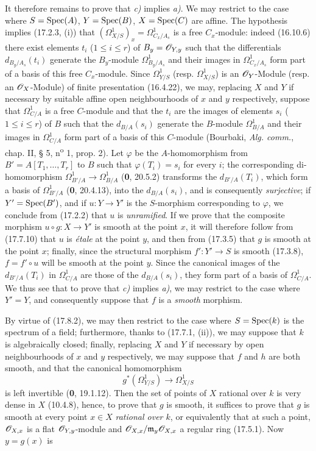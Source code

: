 
It therefore remains to prove that \emph{c)} implies \emph{a)}. We may restrict to the case where $S=\operatorname{Spec}(A)$, $Y=\operatorname{Spec}(B)$, $X=\operatorname{Spec}(C)$ are affine. The hypothesis implies (17.2.3, (i)) that $(\varOmega^1_{X/S})_x=\Omega^1_{C_x/A_s}$ is a free $C_x$-module: indeed (16.10.6) there exist elements $t_i$ ($1\leq i\leq r$) of $B_y=\mathscr{O}_{Y,y}$ such that the differentials $d_{B_y/A_s}(t_i)$ generate the $B_y$-module $\Omega^1_{B_y/A_s}$ and their images in $\Omega^1_{C_x/A_s}$ form part of a basis of this free $C_x$-module. Since $\varOmega^1_{Y/S}$ (resp. $\varOmega^1_{X/S}$) is an $\mathscr{O}_Y$-Module (resp. an $\mathscr{O}_X$-Module) of finite presentation (16.4.22), we may, replacing $X$ and $Y$ if necessary by suitable affine open neighbourhoods of $x$ and $y$ respectively, suppose that $\Omega^1_{C/A}$ is a free $C$-module and that the $t_i$ are the images of elements $s_i$ ($1\leq i\leq r$) of $B$ such that the $d_{B/A}(s_i)$ generate the $B$-module $\Omega^1_{B/A}$ and their images in $\Omega^1_{C/A}$ form part of a basis of this $C$-module (Bourbaki, \emph{Alg. comm.}, chap. II, § 5, n\textsuperscript{o} 1, prop. 2). Let $\varphi$ be the $A$-homomorphism from $B'=A[T_1,\ldots,T_r]$ to $B$ such that $\varphi(T_i)=s_i$ for every $i$; the corresponding di-homomorphism $\Omega^1_{B'/A}\to\Omega^1_{B/A}$ (\textbf{0}, 20.5.2) transforms the $d_{B'/A}(T_i)$, which form a basis of $\Omega^1_{B'/A}$ (\textbf{0}, 20.4.13), into the $d_{B/A}(s_i)$, and is consequently \emph{surjective}; if $Y'=\operatorname{Spec}(B')$, and if $u:Y\to Y'$ is the $S$-morphism corresponding to $\varphi$, we conclude from (17.2.2) that $u$ is \emph{unramified}. If we prove that the composite morphism $u\circ g:X\to Y'$ is smooth at the point $x$, it will therefore follow from (17.7.10) that $u$ is \emph{étale} at the point $y$, and then from (17.3.5) that $g$ is smooth at the point $x$; finally, since the structural morphism $f':Y'\to S$ is smooth (17.3.8), $f=f'\circ u$ will be smooth at the point $y$. Since the canonical images of the $d_{B'/A}(T_i)$ in $\Omega^1_{C/A}$ are those of the $d_{B/A}(s_i)$, they form part of a basis of $\Omega^1_{C/A}$. We thus see that to prove that \emph{c)} implies \emph{a)}, we may restrict to the case where $Y'=Y$, and consequently suppose that $f$ is a \emph{smooth} morphism.

By virtue of (17.8.2), we may then restrict to the case where $S=\operatorname{Spec}(k)$ is the spectrum of a field; furthermore, thanks to (17.7.1, (ii)), we may suppose that $k$ is algebraically closed; finally, replacing $X$ and $Y$ if necessary by open neighbourhoods of $x$ and $y$ respectively, we may suppose that $f$ and $h$ are both smooth, and that the canonical homomorphism
\[
g^*(\varOmega^1_{Y/S})\to\varOmega^1_{X/S}
\]
is left invertible (\textbf{0}, 19.1.12). Then the set of points of $X$ rational over $k$ is very dense in $X$ (10.4.8), hence, to prove that $g$ is smooth, it suffices to prove that $g$ is smooth at every point $x\in X$ \emph{rational over $k$}, or equivalently that at such a point, $\mathscr{O}_{X,x}$ is a flat $\mathscr{O}_{Y,y}$-module and $\mathscr{O}_{X,x}/\mathfrak m_y\mathscr{O}_{X,x}$ a regular ring (17.5.1). Now $y=g(x)$ is

